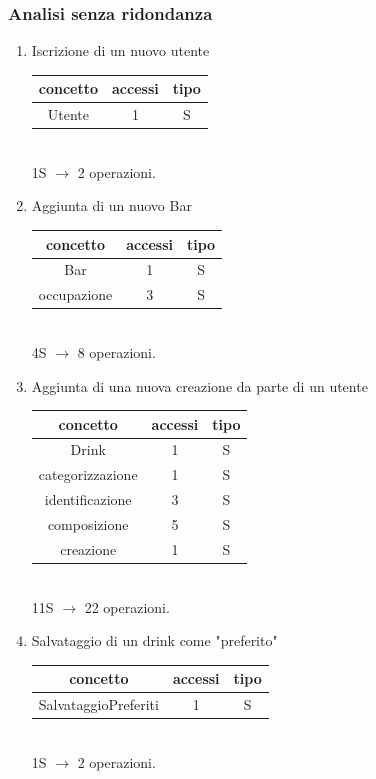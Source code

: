 \documentclass[a4paper,12pt]{report}
\begin{document}
\subsubsection{Analisi senza ridondanza}
\begin{enumerate}
    \item Iscrizione di un nuovo utente\\
    \begin{tabular}{c|c|c}
    concetto & accessi & tipo\\
    \hline
        Utente & 1 & S\\
    \hline
    \end{tabular}
    \\1S $\to$ 2 operazioni.

    \item Aggiunta di un nuovo Bar\\
    \begin{tabular}{c|c|c}
    concetto & accessi & tipo\\
    \hline
        Bar & 1 & S\\
        occupazione & 3 & S\\
    \hline
    \end{tabular}
    \\4S $\to$ 8 operazioni.

    \item Aggiunta di una nuova creazione \footnotesize da parte di un utente\\ \normalsize
    \begin{tabular}{c|c|c}
    concetto & accessi & tipo\\
    \hline
        Drink & 1 & S\\
        categorizzazione & 1 & S\\
        identificazione & 3 & S\\
        composizione & 5 & S\\
        creazione & 1 & S\\
    \hline
    \end{tabular}
    \\11S $\to$ 22 operazioni.

    \item Salvataggio di un drink come "preferito"\\
    \begin{tabular}{c|c|c}
    concetto & accessi & tipo\\
    \hline
        SalvataggioPreferiti & 1 & S\\
    \hline
    \end{tabular}
    \\1S $\to$ 2 operazioni.


\end{enumerate}
\end{document}
